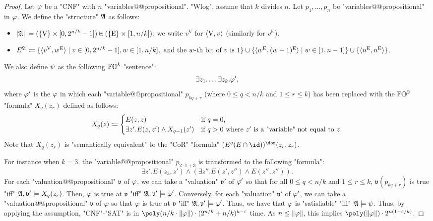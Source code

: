 \begin{proof}
    Let $\fml$ be a "CNF" with $n$ "variables@@propositional".
    "Wlog", assume that $k$ divides $n$.
    Let $p_1, \dots, p_{n}$ be "variables@@propositional" in $\fml$.
    We define the "structure" $\struc$ as follows:
    \begin{itemize}
        \item $\univ{\struc} \defeq (\set{\mathrm{V}} \times \range{0, 2^{n/k}-1}) \uplus (\set{\mathrm{E}} \times \range{1, n/k})$; we write $v^{\mathrm{V}}$ for $\langle\mathrm{V}, v\rangle$ (similarly for $v^{\mathrm{E}}$).
        \item $E^{\struc} \defeq \set{\tuple{v^{\mathrm{V}}, w^{\mathrm{E}}} \mid v \in \range{0, 2^{n/k}-1}, w \in \range{1, n/k}, \text{ and the $w$-th bit of $v$ is 1}} \cup \set{\tuple{w^{\mathrm{E}}, (w+1)^{\mathrm{E}}} \mid w \in \range{1, n-1}} \cup \set{\tuple{n^{\mathrm{E}}, n^{\mathrm{E}}}}$.
    \end{itemize}
    We also define $\fml[2]$ as the following $\mathbb{FO}^{k}$ "sentence":
    \[\exists z_1. \dots \exists z_k. \fml[1]',\]
    where $\fml[1]'$ is the $\fml$ in which
    each "variable@@propositional" $p_{kq+r}$ (where $0 \le q < n/k$ and $1 \le r \le k$) has been replaced with
    the  $\mathbb{FO}^{2}$  "formula" $X_q(z_r)$ defined as follows:
    \[X_q(z) \coloneq \begin{cases}
        E(z, z) & \text{if $q = 0$,}\\
        \exists z'. E(z, z') \land X_{q-1}(z') & \text{if $q > 0$ where $z'$ is a "variable" not equal to $z$}.
    \end{cases}\]
    Note that $X_q(z_r)$ is "semantically equivalent" to the "CoR" "formula" $(E^{q} (E \cap \id))^{\dom}(z_r, z_r)$.

    For instance when $k = 3$, the "variable@@propositional" $p_{2 \cdot 1 + 3}$ is 
    transformed to the following "formula":
    \[\exists z'. E(z_3, z') \land (\exists z''. E(z', z'') \land E(z'', z'')).\]
    For each "valuation@@propositional" $\mathfrak{v}$ of $\fml$, 
    we can take a "valuation" $\mathfrak{v}'$ of $\fml'$ so that for all $0 \le q < n/k$ and $1 \le r \le k$,
    $\mathfrak{v}(p_{kq+r})$ is true "iff" $\struc, \mathfrak{v}' \models X_q(z_r)$.
    Then, $\fml$ is true at $\mathfrak{v}$ "iff" $\struc, \mathfrak{v}' \models \fml[1]'$.
    Conversely, for each "valuation" $\mathfrak{v}'$ of $\fml'$, we can take a "valuation@@propositional" $\mathfrak{v}$ of $\fml$ so that
    $\fml$ is true at $\mathfrak{v}$ "iff" $\struc, \mathfrak{v}' \models \fml[1]'$.
    Thus, we have that $\fml$ is "satisfiable" "iff" $\struc \models \fml[2]$.
    Thus, by applying the assumption,
    "CNF"-"SAT" is in $\poly(n/k \cdot \len{\fml}) \cdot (2^{n/k} + n/k)^{k-\eps}$ time.%
    As $n \le \len{\fml}$, this implies $\poly(\len{\fml}) \cdot 2^{n(1-\eps/k)}$.
\end{proof}

